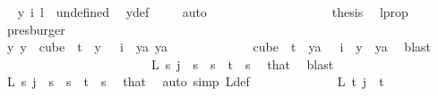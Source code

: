 \begin{isabellebody}
\ \isamarkupfalse%
\ {\isachardoublequoteopen}y\ i\ l\ {\isacharequal}{\kern0pt}\ undefined{\isachardoublequoteclose}\ \isamarkupfalse%
\ y{\isacharunderscore}{\kern0pt}def\ \isamarkupfalse%
\ {}\ \isamarkupfalse%
\ auto\isanewline
\ \ \ \ \ \ \ \ \ \ \ \ \ \ \ \ \isamarkupfalse%
\ \isamarkupfalse%
\ {\isacharquery}{\kern0pt}thesis\ \isamarkupfalse%
\ l{\isacharunderscore}{\kern0pt}prop\ \isamarkupfalse%
\ presburger\isanewline
\ \ \ \ \ \ \ \ \ \ \ \ \ \ \isamarkupfalse%
\isanewline
\ \ \ \ \ \ \ \ \ \ \ \ \isamarkupfalse%
\isanewline
\ \ \ \ \ \ \ \ \ \ \ \ \isamarkupfalse%
\ \isamarkupfalse%
\ {\isachardoublequoteopen}{\isasymexists}y{\isachardot}{\kern0pt}\ {\isacharparenleft}{\kern0pt}y\ {\isasymin}\ cube\ {}\ t\ {\isasymand}\ y\ {}\ {\isacharequal}{\kern0pt}\ i{\isacharparenright}{\kern0pt}\ {\isasymand}\ {\isacharparenleft}{\kern0pt}{\isasymforall}ya{\isachardot}{\kern0pt}\ ya\isanewline
\ \ \ \ \ \ \ \ \ \ \ \ {\isasymin}\ cube\ {}\ t\ {\isasymand}\ ya\ {}\ {\isacharequal}{\kern0pt}\ i\ {\isasymlongrightarrow}\ y\ {\isacharequal}{\kern0pt}\ ya{\isacharparenright}{\kern0pt}{\isachardoublequoteclose}\ \isamarkupfalse%
\ blast\isanewline
\isanewline
\ \ \ \ \ \ \ \ \ \ \isamarkupfalse%
\isanewline
\ \ \ \ \ \ \ \ \ \ \isamarkupfalse%
\ \isamarkupfalse%
\ {\isachardoublequoteopen}L\ s\ j\ {\isacharequal}{\kern0pt}\ s{\isachardoublequoteclose}\ \ {\isachardoublequoteopen}s\ {\isacharless}{\kern0pt}\ t{\isachardoublequoteclose}\ \ s\ \isamarkupfalse%
\ that\ \isamarkupfalse%
\ blast\isanewline
\ \ \ \ \ \ \ \ \ \ \isamarkupfalse%
\ \isamarkupfalse%
\ {\isachardoublequoteopen}L{\isacharprime}{\kern0pt}\ s\ j\ {\isacharequal}{\kern0pt}\ s{\isachardoublequoteclose}\ \ {\isachardoublequoteopen}s\ {\isacharless}{\kern0pt}\ t{\isachardoublequoteclose}\ \ s\ \isamarkupfalse%
\ that\ \isamarkupfalse%
\ {\isacharparenleft}{\kern0pt}auto\ simp{\isacharcolon}{\kern0pt}\ L{\isacharprime}{\kern0pt}{\isacharunderscore}{\kern0pt}def{\isacharparenright}{\kern0pt}\isanewline
\ \ \ \ \ \ \ \ \ \ \isamarkupfalse%
\ \isamarkupfalse%
\ {\isachardoublequoteopen}L{\isacharprime}{\kern0pt}\ t\ j\ {\isacharequal}{\kern0pt}\ t{\isachardoublequoteclose}\ \isamarkupfalse%

\end{isabellebody}
